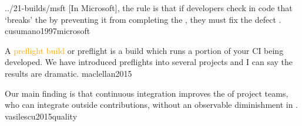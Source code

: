 \documentclass{article}
\begin{document}
\lnQuote
  {../21-builds/msft}
  {[In Microsoft], the rule is that if developers check in code that `breaks' the  by preventing it from completing the , they must fix the defect .}
  {cusumano1997microsoft}

  {A \textcolor{orange}{preflight build} or preflight is a build which runs a portion of your CI  being developed. We have introduced preflights into several projects and I can say the results are dramatic.}
  {maclellan2015}



  {Our main finding is that continuous integration improves the  of project teams, who can integrate  outside contributions, without an observable diminishment in .}
  {vasilescu2015quality}
\end{document}
